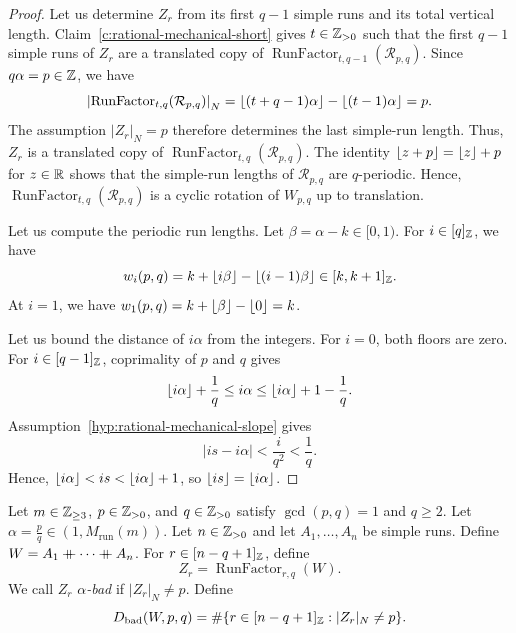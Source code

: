 \begin{proof}
 Let us determine $Z_r$ from its first $q-1$ simple runs and its total vertical length.
Claim~\ref{c:rational-mechanical-short} gives $t\in\mathbb Z_{>0}$ such that the first $q-1$ simple runs
of $Z_r$ are a translated copy of $\operatorname{RunFactor}_{t,q-1}(\mathcal R_{p,q})$.
Since $q\alpha=p\in\mathbb Z$, we have
\[
 \left|\operatorname{RunFactor}_{t,q}(\mathcal R_{p,q})\right|_N
 =\left\lfloor(t+q-1)\alpha\right\rfloor-\left\lfloor(t-1)\alpha\right\rfloor=p.
\]
The assumption $|Z_r|_N=p$ therefore determines the last simple-run length.
Thus, $Z_r$ is a translated copy of $\operatorname{RunFactor}_{t,q}(\mathcal R_{p,q})$.
The identity $\left\lfloor z+p\right\rfloor=\left\lfloor z\right\rfloor+p$ for $z\in\mathbb R$ shows that the simple-run lengths of $\mathcal R_{p,q}$
are $q$-periodic. Hence, $\operatorname{RunFactor}_{t,q}(\mathcal R_{p,q})$ is a cyclic rotation of $W_{p,q}$ up to translation.

 Let us compute the periodic run lengths.
Let $\beta=\alpha-k\in[0,1)$.
For $i\in[q]_{\mathbb Z}$, we have
\[
 w_i(p,q)=k+\left\lfloor i\beta\right\rfloor-\left\lfloor(i-1)\beta\right\rfloor\in[k,k+1]_{\mathbb Z}.
\]
At $i=1$, we have $w_1(p,q)=k+\left\lfloor\beta\right\rfloor-\left\lfloor0\right\rfloor=k$.

 Let us bound the distance of $i\alpha$ from the integers.
For $i=0$, both floors are zero.
For $i\in[q-1]_{\mathbb Z}$, coprimality of $p$ and $q$ gives
\[
 \left\lfloor i\alpha\right\rfloor+\frac1q\le i\alpha
 \le\left\lfloor i\alpha\right\rfloor+1-\frac1q.
\]
Assumption~\ref{hyp:rational-mechanical-slope} gives
\[
 |is-i\alpha|<\frac{i}{q^2}<\frac1q.
\]
Hence, $\left\lfloor i\alpha\right\rfloor<is<\left\lfloor i\alpha\right\rfloor+1$, so $\left\lfloor is\right\rfloor=\left\lfloor i\alpha\right\rfloor$.
\end{proof}

\begin{definition}\label{sync:rational:264}
Let $m\in\mathbb Z_{\ge3}$, $p\in\mathbb Z_{>0}$, and $q\in\mathbb Z_{>0}$ satisfy $\gcd(p,q)=1$ and $q\ge2$.
Let $\alpha=\frac pq\in(1,M_{\mathrm{run}}(m))$.
Let $n\in\mathbb Z_{>0}$ and let $A_1,\ldots,A_n$ be simple runs.
Define $W=A_1\mathbin{+\mkern-10mu+} \cdots\mathbin{+\mkern-10mu+} A_n$.
For $r\in[n-q+1]_{\mathbb Z}$, define
\[
 Z_r=\operatorname{RunFactor}_{r,q}(W).
\]
We call $Z_r$ \textit{$\alpha$-bad} if $|Z_r|_N\ne p$.
Define
\[
 D_{\mathrm{bad}}(W,p,q)=\#\{r\in[n-q+1]_{\mathbb Z}:|Z_r|_N\ne p\}.
\]
\end{definition}

